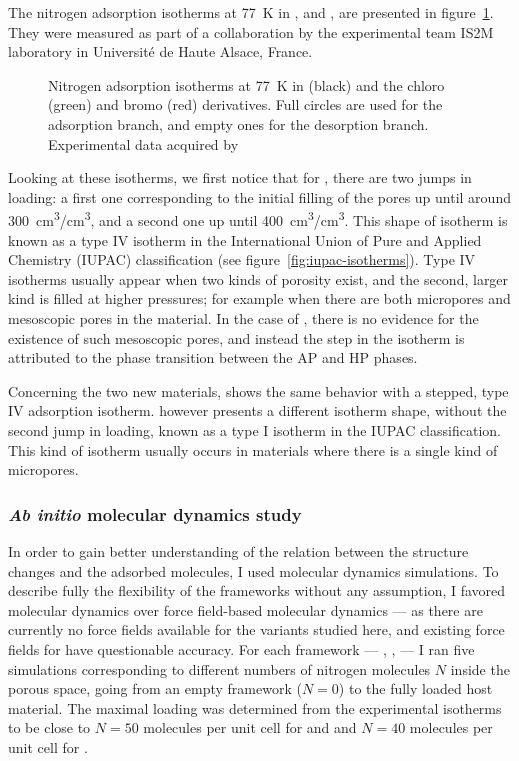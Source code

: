 \documentclass[thesis]{subfiles}
\begin{document}
The nitrogen adsorption isotherms at \SI{77}{K} in , \ZIFCl and \ZIFBr,
are presented in figure~\ref{fig:zif8x:isotherms}. They were measured as part of
a collaboration by the experimental team IS2M laboratory in Université de Haute
Alsace, France.

\begin{figure}[ht]
    \centering
    
    \caption{Nitrogen adsorption isotherms at \SI{77}{K} in  (black) and
    the chloro (green) and bromo (red) derivatives. Full circles are used for
    the adsorption branch, and empty ones for the desorption branch.
    Experimental data acquired by \citeauthor{Chaplais2018}\cite{Chaplais2018}}
    \label{fig:zif8x:isotherms}
\end{figure}

Looking at these isotherms, we first notice that for , there are two jumps
in loading: a first one corresponding to the initial filling of the pores up
until around \SI{300}{cm^3/cm^3}, and a second one up until
\SI{400}{cm^3/cm^3}. This shape of isotherm is known as a type IV isotherm in
the International Union of Pure and Applied Chemistry (IUPAC)
classification\cite{Sing1985} (see figure~\ref{fig:iupac-isotherms}). Type IV
isotherms usually appear when two kinds of porosity exist, and the second, larger
kind is filled at higher pressures; for example when there are both micropores
and mesoscopic pores in the material. In the case of , there is no evidence
for the existence of such mesoscopic pores, and instead the step in the isotherm
is attributed to the phase transition between the AP and HP phases.

Concerning the two new materials, \ZIFCl shows the same behavior with a stepped,
type IV adsorption isotherm. \ZIFBr however presents a different isotherm shape,
without the second jump in loading, known as a type I isotherm in the IUPAC
classification. This kind of isotherm usually occurs in materials where there is
a single kind of micropores.

\subsubsection{\emph{Ab initio} molecular dynamics study}
\label{sec:zif8x:methods}

In order to gain better understanding of the relation between the structure
changes and the adsorbed molecules, I used molecular dynamics simulations. To
describe fully the flexibility of the frameworks without any assumption, I
favored \abinitio molecular dynamics over force field-based molecular dynamics
--- as there are currently no force fields available for the  variants
studied here, and existing force fields for  have questionable accuracy.
For each framework --- , \ZIFCl, \ZIFBr --- I ran five simulations
corresponding to different numbers of nitrogen molecules $N$ inside the porous
space, going from an empty framework ($N = 0$) to the fully loaded host
material. The maximal loading was determined from the experimental isotherms to
be close to $N = 50$ molecules per unit cell for  and \ZIFCl and $N = 40$
molecules per unit cell for \ZIFBr.
\end{document}
